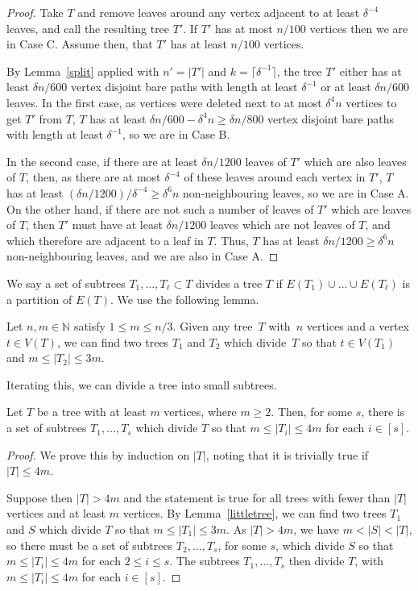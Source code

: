 \begin{proof}
Take $T$ and remove leaves around any vertex adjacent to at least $\delta^{-4}$ leaves, and call the resulting tree $T'$. If $T'$ has at most $n/100$ vertices then we are in Case C. Assume then, that $T'$ has at least $n/100$ vertices.

By Lemma~\ref{split} applied with $n'=|T'|$ and $k=\lceil \delta^{-1}\rceil$, the tree $T'$  either has at least $\delta n/600$ vertex disjoint bare paths with length at least $\delta^{-1}$ or at least $\delta n/600$ leaves. In the first case, as vertices were deleted next to at most $\delta^4 n$ vertices to get $T'$ from $T$, $T$ has at least $\delta n/600-\delta^4n\geq  \delta n/800$ vertex disjoint bare paths with length at least $\delta^{-1}$, so we are in Case B.

In the second case, if there are at least $\delta n/1200$ leaves of $T'$ which are also leaves of $T$, then, as there are at most $\delta^{-4}$ of these leaves around each vertex in $T'$, $T$ has at least $(\delta n/1200)/\delta^{-4}\geq \delta^{6}n$ non-neighbouring leaves, so we are in Case A. On the other hand, if there are not such a number of leaves of $T'$ which are leaves of $T$, then $T'$ must have at least $\delta n/1200$ leaves which are not leaves of $T$, and which therefore are adjacent to a leaf in $T$. Thus, $T$ has at least $\delta n/1200\geq \delta^{6}n$ non-neighbouring leaves, and we are also in Case A.
\end{proof}
We say a set of subtrees $T_1,\ldots, T_\ell\subset T$ divides a tree $T$ if $E(T_1)\cup\ldots \cup E(T_\ell)$ is a partition of $E(T)$. We use the following lemma.

\begin{lemma}\label{littletree} Let $n,m\in \mathbb N$ satisfy $1\leq m\leq n/3$. Given any tree~$T$ with~$n$ vertices and a vertex $t\in V(T)$, we can find two trees $T_1$ and $T_2$ which divide~$T$ so that $t\in V(T_1)$ and $m\leq |T_2|\leq 3m$.
\end{lemma}
Iterating this, we can divide a tree into small subtrees.
\begin{lemma}\label{dividetree} Let $T$ be a tree with at least $m$ vertices, where $m\geq 2$. Then, for some $s$, there is a set of subtrees $T_1,\ldots, T_s$ which divide $T$ so that $m\leq |T_i|\leq 4m$ for each $i\in [s]$.
\end{lemma}
\begin{proof}
We prove this by induction on $|T|$, noting that it is trivially true if $|T|\leq 4m$.

Suppose then $|T|>4m$ and the statement is true for all trees with fewer than $|T|$ vertices and at least $m$ vertices. By Lemma~\ref{littletree}, we can find two trees $T_1$ and $S$ which divide $T$ so that $m\leq |T_1|\leq 3m$. As $|T|>4m$, we have $m<|S|<|T|$, so there must be a set of subtrees $T_2,\ldots,T_s$, for some $s$, which divide $S$ so that $m\leq |T_i|\leq 4m$ for each $2\leq i\leq s$.
The subtrees $T_1,\ldots,T_s$ then divide $T$, with $m\leq |T_i|\leq 4m$ for each $i\in [s]$.
\end{proof}

